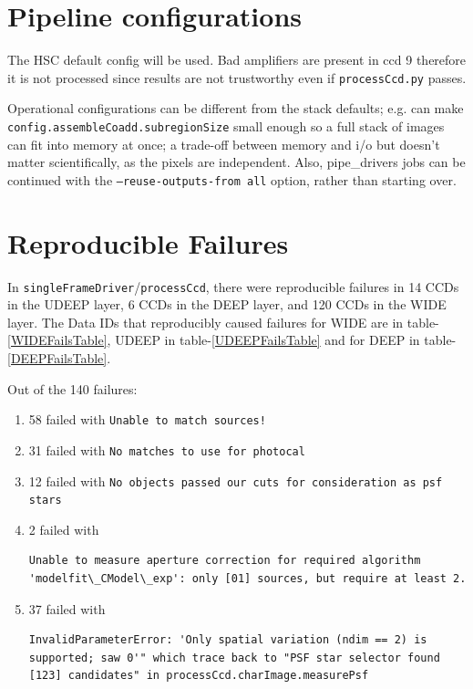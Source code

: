 \section{Pipeline configurations}
The HSC default config will be used.
Bad amplifiers are present in ccd 9 therefore it is not processed since results are not trustworthy even if \texttt{processCcd.py} passes.


Operational configurations can be different from the stack defaults; e.g. can make \newline \texttt{config.assembleCoadd.subregionSize} small enough so a full stack of images can fit into memory at once; a trade-off between memory and i/o but doesn't matter scientifically, as the pixels are independent.
Also, pipe\_drivers jobs can be continued with the \texttt{--reuse-outputs-from all} option, rather than starting over.

\section{Reproducible Failures}
In \texttt{singleFrameDriver}/\texttt{processCcd}, there were reproducible failures in 14 CCDs in the UDEEP layer, 6 CCDs in the DEEP layer, and 120 CCDs in the WIDE layer.
The Data IDs that reproducibly caused failures for WIDE are in table-\ref{WIDEFailsTable}, UDEEP in table-\ref{UDEEPFailsTable} and for DEEP in table-\ref{DEEPFailsTable}.

\clearpage




Out of the 140 failures:
\begin{enumerate}
\item 58 failed with \lstinline[style=basherror]+Unable to match sources!+
\item 31 failed with \lstinline[style=basherror]+No matches to use for photocal+
\item 12 failed with \lstinline[style=basherror]+No objects passed our cuts for consideration as psf stars+
\item 2 failed with
    \begin{lstlisting}[style=basherror]
    Unable to measure aperture correction for required algorithm 'modelfit\_CModel\_exp': only [01] sources, but require at least 2.
    \end{lstlisting}
\item 37 failed with
    \begin{lstlisting}[style=basherror]
    InvalidParameterError: 'Only spatial variation (ndim == 2) is supported; saw 0'" which trace back to "PSF star selector found [123] candidates" in processCcd.charImage.measurePsf
    \end{lstlisting}
\end{enumerate}

